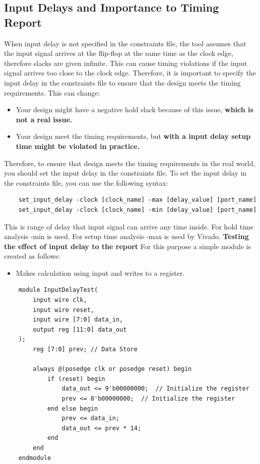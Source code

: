 \documentclass{report}
\begin{document}
\subsection{Input Delays and Importance to Timing Report}
When input delay is not specified in the constraints file, the tool assumes that the input signal arrives at the flip-flop at the same time as the clock edge, therefore slacks are given infinite. This can cause timing violations if the input signal arrives too close to the clock edge. Therefore, it is important to specify the input delay in the constraints file to ensure that the design meets the timing requirements. This can change:
\begin{itemize}
    \item Your design might have a negative hold slack because of this issue, \textbf{which is not a real issue.}
    \item Your design meet the timing requirements, but \textbf{ with a input delay setup time might be violated in practice.}
\end{itemize}
Therefore, to ensure that design meets the timing requirements in the real world, you should set the input delay in the constraints file.
To set the input delay in the constraints file, you can use the following syntax:
\begin{verbatim}
    set_input_delay -clock [clock_name] -max [delay_value] [port_name]
    set_input_delay -clock [clock_name] -min [delay_value] [port_name]
\end{verbatim}
This is range of delay that input signal can arrive any time inside. For hold time analysis -min is used. For setup time analysis -max is used by Vivado.
\textbf{Testing the effect of input delay to the report}
For this purpose a simple module is created as follows:
\begin{itemize}
    \item Makes calculation using input and writes to a register.
\end{itemize}
\begin{verbatim}
    module InputDelayTest(
        input wire clk,
        input wire reset,
        input wire [7:0] data_in,
        output reg [11:0] data_out
    );
        reg [7:0] prev; // Data Store

        always @(posedge clk or posedge reset) begin
            if (reset) begin
                data_out <= 9'b00000000;  // Initialize the register
                prev <= 8'b00000000;  // Initialize the register
            end else begin
                prev <= data_in;
                data_out <= prev * 14;
            end
        end
    endmodule
\end{verbatim}
\end{document}
